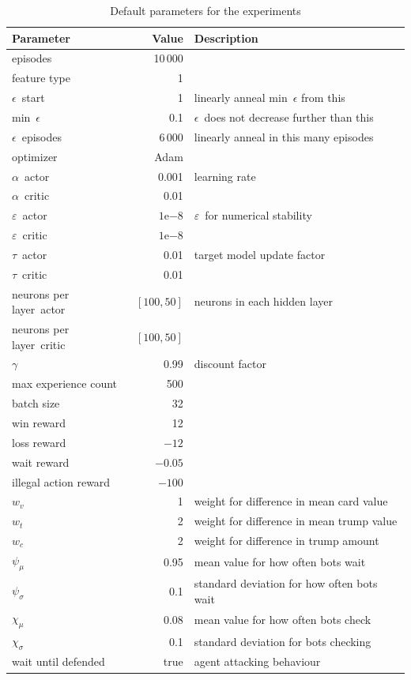 \documentclass[a4paper,titlepage]{article}
\newcommand{\expn}[2]{{#1}\mathrm{e}{#2}}
\begin{document}
\begin{table}[h]
\centering
  \begin{tabular}{lrl}
    \toprule
    Parameter & Value & Description \\
    \midrule
    episodes & 10\,000 \\
    feature type & 1 \\
    $\epsilon$~start & 1 & linearly anneal min~$\epsilon$ from this\\
    min~$\epsilon$ & 0.1 & $\epsilon$~does not decrease further than this \\
    $\epsilon$~episodes & 6\,000 & linearly anneal in this many episodes \\
    optimizer & Adam \\
    $\alpha$~actor & 0.001 & learning rate \\
    $\alpha$~critic & 0.01 \\
    $\varepsilon$~actor & $\expn{1}{-8}$ & $\varepsilon$~for numerical stability \\
    $\varepsilon$~critic & $\expn{1}{-8}$ \\
    $\tau$~actor & 0.01 & target model update factor \\
    $\tau$~critic & 0.01 \\
    neurons per layer~actor & $[100, 50]$ & neurons in each hidden layer \\
    neurons per layer~critic & $[100, 50]$ \\
    $\gamma$ & 0.99 & discount factor \\
    max experience count & 500 \\
    batch size & 32 \\
    win reward & 12 \\
    loss reward & $-12$ \\
    wait reward & $-0.05$ \\
    illegal action reward & $-100$ \\
    $w_v$ & 1 & weight for difference in mean card value \\
    $w_t$ & 2 & weight for difference in mean trump value \\
    $w_c$ & 2 & weight for difference in trump amount \\
    $\psi_\mu$ & 0.95 & mean value for how often bots wait \\
    $\psi_\sigma$ & 0.1 & standard deviation for how often bots wait \\
    $\chi_\mu$ & 0.08 & mean value for how often bots check \\
    $\chi_\sigma$ & 0.1 & standard deviation for bots checking \\
    wait until defended & true & agent attacking behaviour \\
    \bottomrule
  \end{tabular}
  \caption{Default parameters for the experiments}
  \label{table:parameters}
\end{table}
\end{document}
